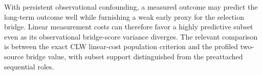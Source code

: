 With persistent observational confounding, a measured outcome may predict the long-term outcome well while furnishing a weak early proxy for the selection bridge. Linear measurement costs can therefore favor a highly predictive subset even as its observational bridge-score variance diverges. The relevant comparison is between the exact CLW linear-cost population criterion and the profiled two-source bridge value, with subset support distinguished from the preattached sequential roles.